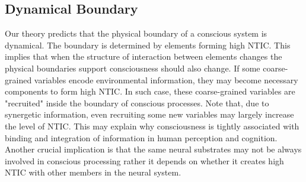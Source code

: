         \subsection{Dynamical Boundary}
        Our theory predicts that the physical boundary of a conscious system is dynamical. The boundary is determined by elements forming high NTIC. This implies that when the structure of interaction between elements changes the physical boundaries support consciousness should also change. If some coarse-grained variables encode environmental information, they may become necessary components to form high NTIC. In such case, these coarse-grained variables are "recruited" inside the boundary of conscious processes. Note that, due to synergetic information, even recruiting some new variables may largely increase the level of NTIC. 
        This may explain why consciousness is tightly associated with binding and integration of information in human perception and cognition. Another crucial implication is that the same neural substrates may not be always involved in conscious processing rather it depends on whether it creates high NTIC with other members in the neural system. 
    
\rlend